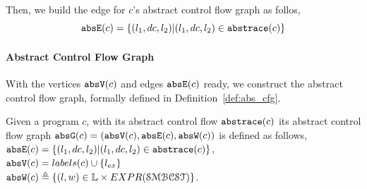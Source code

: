 Then, we build the edge for $c$'s abstract control flow graph as follos,
\[
  \mathtt{abs}{\mathtt{E}}(c) = \{(l_1, dc, l_2) | (l_1, dc, l_2) \in \mathtt{abs}{\mathtt{trace}}(c)\}
  \]

%


\paragraph{Abstract Control Flow Graph} 
With the vertices $\mathtt{abs}{\mathtt{V}}(c)$ and edges $\mathtt{abs}{\mathtt{E}}(c)$ ready, we construct the abstract control flow graph, formally 
defined in 
Definition~\ref{def:abs_cfg}.
\begin{defn}
\label{def:abs_cfg}
Given a program $c$, 
with its abstract control flow $\mathtt{abs}{\mathtt{trace}}(c)$
its abstract control flow graph $\mathtt{abs}{\mathtt{G}}(c) =(\mathtt{abs}{\mathtt{V}}(c), \mathtt{abs}{\mathtt{E}}(c), \mathtt{abs}{\mathtt{W}}(c))$ is defined as follows,
\\
%
$\mathtt{abs}{\mathtt{E}}(c) = \{(l_1, dc, l_2) | (l_1, dc, l_2) \in \mathtt{abs}{\mathtt{trace}}(c)\}$,
\\
$\mathtt{abs}{\mathtt{V}}(c) = labels(c)\cup\{l_{ex}\}$
\\
 $\absW(c) 
\triangleq \left\{ (l, w) \in \mathbb{L} \times EXPR(\constdom) \right\}$.
\end{defn}
% 
